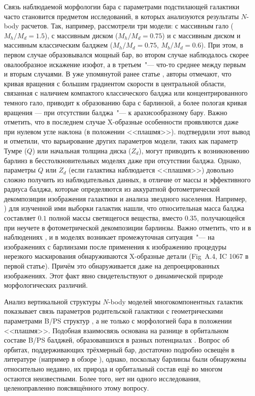 \documentclass{trlnotes}
\begin{document}
Связь наблюдаемой морфологии бара с параметрами подстилающей галактики часто становится предметом исследований, в которых 
анализуются результаты $N$-body расчетов. Так, например,  \citet{athanassoula2002}  рассмотрели три модели: с массивным гало 
($M_h/M_d = 1.5$), с массивным диском ($M_h/M_d = 0.75$) и с массивным диском и массивным классическим балджем 
($M_h/M_d = 0.75$, $M_b/M_d = 0.6$). При этом, в первом случае образовывался мощный  бар, во втором случае наблюдалось скорее овалообразное искажение изофот, а в третьем~"--- что-то среднее между первым и вторым случаями. В уже упомянутой ранее 
статье \cite{salo2017}, авторы отмечают, что кривая вращения с большим градиентом скорости в центральной области, связанная с наличием компактого классического 
балджа или концентрированного темного гало, приводит к образованию бара с барлинзой, а более пологая кривая вращения --- при отсутствии балджа~"--- к арахисообразному бару. Важно отметить, что в последнем случае X-образные особенности проявляются даже при нулевом угле наклона (в положении <<плашмя>>).  
\citet{smirnov2018} подтвердили этот вывод и отметили, что варьирование других параметров модели, таких как 
параметр Тумре ($Q$) или начальная толщина диска ($Z_d$), могут приводить к возникновению барлинз в 
бесстолкновительных моделях даже при отсутствии балджа. Однако, параметры $Q$ или $Z_d$ (если галактика наблюдается <<плашмя>>) довольно сложно получить из наблюдательных 
данных, в отличие от массы и  эффективного радиуса балджа, которые определяются из  аккуратной фотометрической декомпозиции 
изображения галактики и анализа звездного населения. Например,  \citet{laurikainen2014}) для изученной ими выборки галактик нашли, что относительная масса балджа составляет 
$0.1$ полной массы светящегося вещества, вместо $0.35$, получающейся при неучете в фотометрической декомпозиции  барлинзы. Важно отметить, что и в наблюдениях
\citep{laurikainen2017}, и в моделях \citep{salo2017} возникает промежуточная ситуация~"--- на изображениях с барлинзами после применения к изображению процедуры нерезкого маскирования обнаруживаются X-образные детали (Fig~A.4, IC 1067 в первой статье). Причём это обнаруживается даже на депроецированных изображениях. Этот факт явно свидетельствуют о динамической природе морфологических различий. 

Анализ вертикальной структуры $N$-body моделей многокомпонентных галактик показывает связь параметров родительской
галактики с геометрическими параметрами B/PS структур \citep{smirnov2018}, а не только с морфологией бара
в положении <<плашмя>>. Подобная взаимосвязь основана на разнице в орбитальном составе B/PS балджей, образовавшихся в разных
потенциалах \citep{parul2020}. Вопрос об орбитах, поддерживающих трёхмерный бар, достаточно подробно освещён в
литературе (например в обзоре \cite{athanassoula2016}), однако, поскольку барлинзы были обнаружены относительно
недавно, их природа и орбитальный состав ещё во многом остаются неизвестными. Более того, нет ни одного исследования, целеноправленно поясвящённого этому вопросу.
\end{document}
